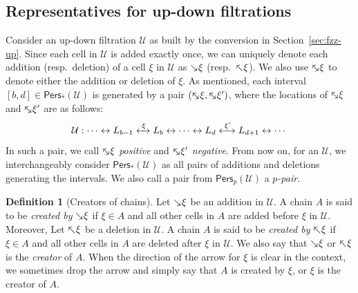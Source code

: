 \documentclass[letterpaper,11pt]{article}
\theoremstyle{mythmstyle}
\theoremstyle{mydefstyle}
\newtheorem{definition}{Definition}
\theoremstyle{plain}
\theoremstyle{definition}
\newtheorem{definition}[theorem]{Definition}
\newcommand{\Pers}{\mathsf{Pers}}
\newcommand{\<}[1]{\langle #1\rangle}
\newcommand{\lbarrowspace}{\;}
\newcommand{\lrarrowsp}[1]{\xleftrightarrow{\lbarrowspace#1\lbarrowspace}}
\newcommand{\add}[1]{\mskip-2.5mu\rotatebox[origin=c]{-45}{${\rightarrow}$}{#1}}
\newcommand{\del}[1]{\mskip-2.5mu\rotatebox[origin=c]{-45}{${\leftarrow}$}{#1}}
\newcommand{\addel}[1]{\mskip-2.5mu\rotatebox[origin=c]{-45}{${\leftrightarrow}$}{#1}}
\newcommand{\Ucal}{\mathcal{U}}
\newcommand{\varsG}{{\xi}}
\newcommand{\Dim}{p}
\let\defemph\emph
\begin{document}
\subsection{Representatives for up-down filtrations}
Consider
an up-down filtration $\Ucal$  as built by the conversion in Section~\ref{sec:fzz-up}.
Since each cell in $\Ucal$ is added exactly once,
we can uniquely denote each  addition (resp.\ deletion)
of a cell $\varsG$ in $\Ucal$
as $\add{\varsG}$ (resp.\ $\del{\varsG}$).
We also use $\addel{\varsG}$ to denote
either the addition or deletion of $\varsG$.
As mentioned, each interval $[b,d]\in\Pers_*(\Ucal)$ 
is generated 
by a pair $(\addel{\varsG}, \addel{\varsG'})$,
where the locations of $\addel{\varsG}$ and $\addel{\varsG'}$ are as follows:
\begin{equation*}
\Ucal:
\cdots
\leftrightarrow
L_{b-1}
\lrarrowsp{\varsG}
L_b
\leftrightarrow
\cdots
\leftrightarrow
L_{d}
\lrarrowsp{\varsG'}
L_{d+1}
\leftrightarrow
\cdots
\end{equation*}
In such a pair,
we  call $\addel{\varsG}$ 
\emph{positive}
and $\addel{\varsG'}$ 
\emph{negative}.
From now on, for an $\Ucal$, 
we  interchangeably consider $\Pers_*(\Ucal)$ as all
 pairs of additions and deletions generating the intervals.
We also call a pair from $\Pers_\Dim(\Ucal)$ 
a \emph{$\Dim$-pair}.
\begin{definition}[Creators of chains]
Let $\add{\varsG}$ be an addition  in $\Ucal$.
A chain $A$ is said to be \defemph{created by} 
$\add{\varsG}$ if $\varsG\in A$ and all other cells in $A$
are added before $\varsG$ in $\Ucal$.
Moreover, Let $\del{\varsG}$ be a deletion  in $\Ucal$.
A chain $A$ is said to be \defemph{created by} 
$\del{\varsG}$ if $\varsG\in A$ and all other cells in $A$
are deleted after $\varsG$ in $\Ucal$.
We also say that $\add{\varsG}$ or $\del{\varsG}$ is the \defemph{creator} of $A$.
When the direction of the arrow for $\varsG$ is clear in the context,
we sometimes drop the arrow and simply
say that $A$ is created by $\varsG$, or  $\varsG$ is the creator of $A$.
\end{definition}
\end{document}
